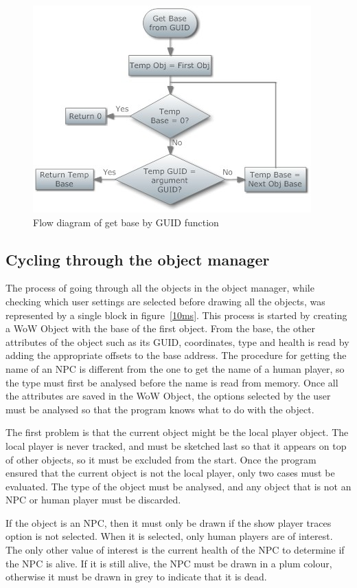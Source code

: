 \begin{figure}[htbp] 
\centering
\includegraphics[scale = 0.65]{getbase.jpg}	
\caption{Flow diagram of get base by GUID function}
\label{getbase}
\end{figure}

\subsection{Cycling through the object manager}

The process of going through all the objects in the object manager, while checking which user settings are selected before drawing all the objects, was represented by a single block in figure~\ref{10ms}. This process is started by creating a WoW Object with the base of the first object. From the base, the other attributes of the object such as its GUID, coordinates, type and health is read by adding the appropriate offsets to the base address. The procedure for getting the name of an NPC is different from the one to get the name of a human player, so the type must first be analysed before the name is read from memory. Once all the attributes are saved in the WoW Object, the options selected by the user must be analysed so that the program knows what to do with the object. 

The first problem is that the current object might be the local player object. The local player is never tracked, and must be sketched last so that it appears on top of other objects, so it must be excluded from the start. Once the program ensured that the current object is not the local player, only two cases must be evaluated. The type of the object must be analysed, and any object that is not an NPC or human player must be discarded.

If the object is an NPC, then it must only be drawn if the show player traces option is not selected. When it is selected, only human players are of interest. The only other value of interest is the current health of the NPC to determine if the NPC is alive. If it is still alive, the NPC must be drawn in a plum colour, otherwise it must be drawn in grey to indicate that it is dead.

